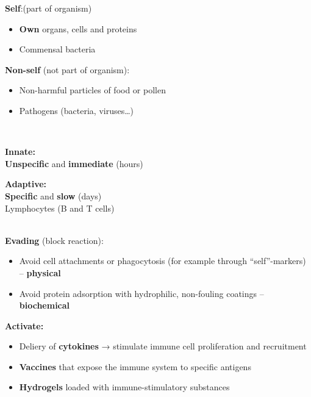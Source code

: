 \begin{minipage}{0.48\linewidth}
    \textbf{Self}:(part of organism)
        \begin{itemize}
            \item \textbf{Own} organs, cells and proteins
            \item Commensal bacteria
        \end{itemize}
\end{minipage}\hfill
\begin{minipage}{0.48\linewidth}
    \textbf{Non-self} (not part of organism):
        \begin{itemize}
            \item Non-harmful particles of food or pollen
            \item Pathogens (bacteria, viruses…)
        \end{itemize}
\end{minipage}\\

\begin{minipage}{0.48\linewidth}
    \textbf{Innate:}\\
    \textbf{Unspecific} and \textbf{immediate} (hours)
\end{minipage} \hfill
\begin{minipage}{0.48\linewidth}
    \textbf{Adaptive:}\\
    \textbf{Specific} and \textbf{slow} (days)\\
    Lymphocytes (B and T cells)
\end{minipage}\\

\vspace{2mm}
    \textbf{Evading} (block reaction):
        \begin{itemize}
            \item Avoid cell attachments or phagocytosis (for example through “self”-markers) \hfill – \textbf{physical}
            \item Avoid protein adsorption with hydrophilic, non-fouling coatings  \hfill –\textbf{biochemical}
        \end{itemize}

\textbf{Activate:}
    \begin{itemize}
        \item Deliery of \textbf{cytokines} → stimulate immune cell proliferation and recruitment
        \item \textbf{Vaccines }that expose the immune system to specific antigens
        \item \textbf{Hydrogels} loaded with immune-stimulatory substances
    \end{itemize}